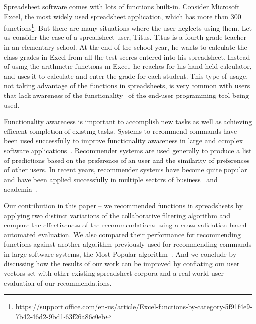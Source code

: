 \documentclass{article} %
\begin{document}
Spreadsheet software comes with lots of functions built-in. Consider Microsoft Excel, the most widely used spreadsheet application, which has more than 300 functions\footnote{https://support.office.com/en-us/article/Excel-functions-by-category-5f91f4e9-7b42-46d2-9bd1-63f26a86c0eb}. But there are many situations where the user neglects using them. Let us consider the case of a spreadsheet user, Titus. Titus is a fourth grade teacher in an elementary school. At the end of the school year, he wants to calculate the class grades in Excel from all the test scores entered into his spreadsheet. Instead of using the arithmetic functions in Excel, he reaches for his hand-held calculator, and uses it to calculate and enter the grade for each student. This type of usage, not taking advantage of the functions in spreadsheets, is very common with users that lack awareness of the functionality~\cite{grossman2009survey} of the end-user programming tool being used.

Functionality awareness is important to accomplish new tasks as well as achieving efficient completion of existing tasks. Systems to recommend commands have been used successfully to improve functionality awareness in large and complex software applications~\cite{matejka2009communitycommands,murphy2012improving}. Recommender systems are used generally to produce a list of predictions based on the preference of an user and the similarity of preferences of other users. In recent years, recommender systems have become quite popular and have been applied successfully in multiple sectors of business~\cite{linden2003amazon} and academia~\cite{hsu2008personalized,mcnee2006don}. 

Our contribution in this paper -- we recommended functions in spreadsheets by applying two distinct variations of the collaborative filtering algorithm and compare the effectiveness of the recommendations using a cross validation based automated evaluation. We also compared their performance for recommending functions against another algorithm previously used for recommending commands in large software systems, the Most Popular algorithm~\cite{linton2000owl}. And we conclude by discussing how the results of our work can be improved by conflating our user vectors set with other existing spreadsheet corpora and a real-world user evaluation of our recommendations.

\end{document}
